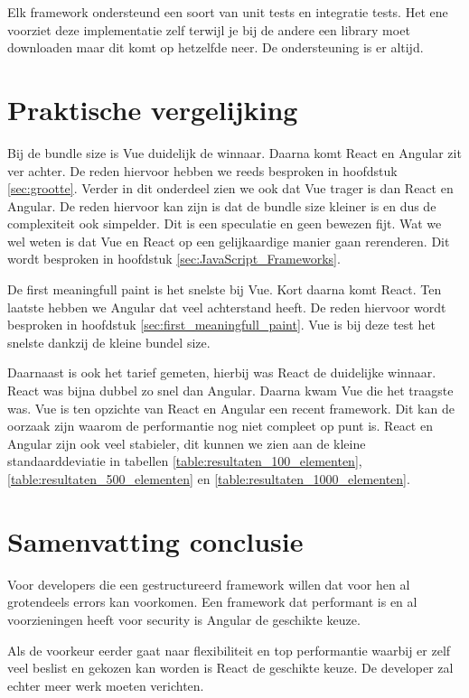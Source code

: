 Elk framework ondersteund een soort van unit tests en integratie tests. Het ene voorziet deze implementatie zelf terwijl je bij de andere een library moet downloaden maar dit komt op hetzelfde neer. De ondersteuning is er altijd.

\section{Praktische vergelijking}

Bij de bundle size is Vue duidelijk de winnaar. Daarna komt React en Angular zit ver achter. De reden hiervoor hebben we reeds besproken in hoofdstuk \ref{sec:grootte}. Verder in dit onderdeel zien we ook dat Vue trager is dan React en Angular. De reden hiervoor kan zijn is dat de bundle size kleiner is en dus de complexiteit ook simpelder. Dit is een speculatie en geen bewezen fijt. Wat we wel weten is dat Vue en React op een gelijkaardige manier gaan rerenderen. Dit wordt besproken in hoofdstuk \ref{sec:JavaScript_Frameworks}.

De first meaningfull paint is het snelste bij Vue. Kort daarna komt React. Ten laatste hebben we Angular dat veel achterstand heeft. De reden hiervoor wordt besproken in hoofdstuk \ref{sec:first_meaningfull_paint}. Vue is bij deze test het snelste dankzij de kleine bundel size.

Daarnaast is ook het tarief gemeten, hierbij was React de duidelijke winnaar. React was bijna dubbel zo snel dan Angular. Daarna kwam Vue die het traagste was. Vue is ten opzichte van React en Angular een recent framework. Dit kan de oorzaak zijn waarom de performantie nog niet compleet op punt is. React en Angular zijn ook veel stabieler, dit kunnen we zien aan de kleine standaarddeviatie in tabellen \ref{table:resultaten_100_elementen}, \ref{table:resultaten_500_elementen} en \ref{table:resultaten_1000_elementen}.

\section{Samenvatting conclusie}

Voor developers die een gestructureerd framework willen dat voor hen al grotendeels errors kan voorkomen. Een framework dat performant is en al voorzieningen heeft voor security is Angular de geschikte keuze.

Als de voorkeur eerder gaat naar flexibiliteit en top performantie waarbij er zelf veel beslist en gekozen kan worden is React de geschikte keuze. De developer zal echter meer werk moeten verichten.

